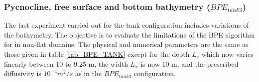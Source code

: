 
\subsubsection{Pycnocline, free surface and bottom bathymetry ($BPE_{tank3}$)}
The last experiment carried out for the tank configuration includes variations of the bathymetry. The objective is to evaluate the limitations of the BPE algorithm for in non-flat domains. The physical and numerical parameters are the same as those given in table \ref{tab_BPE_TANK} except for the depth $L_z$ which now varies linearly between 10 to 9.25 m, the width $L_x$ is now 10 m, and the prescribed diffusivity is $10^{-4}m^2/s$ as in the $BPE_{tank2}$ configuration. 

